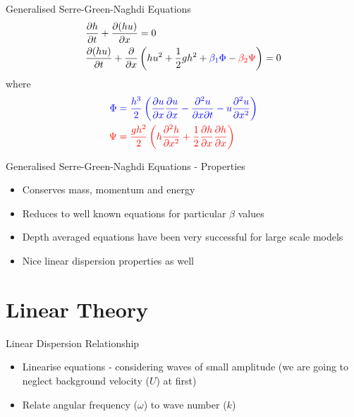 \documentclass[pdf]{beamer}
\begin{document}
\begin{frame}{Generalised Serre-Green-Naghdi Equations}
\begin{align*}
&\dfrac{\partial h}{\partial t} + \dfrac{\partial (hu)}{\partial x} = 0\\
&\dfrac{\partial (hu)}{\partial t} + \dfrac{\partial }{\partial x} \left( hu^2 + \frac{1}{2}gh^2  +  {\color{blue} {\beta_1} \Phi } -   {\color{red} {\beta_2}\Psi}  \right)= 0 \\
\end{align*}
where
\begin{align*}
\color{blue} \Phi  & \color{blue}= \frac{h^3}{2}\left( \frac{\partial u}{\partial x}\frac{\partial u}{\partial x} - \frac{\partial^2 u}{\partial x \partial t} - u\frac{\partial^2 u}{\partial x^2}\right) \\
\color{red} \Psi & \color{red}=  \frac{gh^2}{2} \left(h \frac{\partial^2 h}{\partial x^2} + \frac{1}{2} \frac{\partial h}{\partial x}\frac{\partial h}{\partial x}\right)
\end{align*}
\end{frame}

\begin{frame}{Generalised Serre-Green-Naghdi Equations - Properties}
\begin{itemize}
	\item Conserves mass, momentum and energy
	\item Reduces to well known equations for particular $\beta$ values
	\item Depth averaged equations have been very successful for large scale models
	\item Nice linear dispersion properties as well
\end{itemize}
\end{frame}

\section{Linear Theory}
\begin{frame}{Linear Dispersion Relationship}
\begin{itemize}
	\item Linearise equations - considering waves of small amplitude (we are going to neglect background velocity ($U$) at first)
	\item Relate angular frequency ($\omega$) to  wave number ($k$)
\end{itemize}
\end{frame}
\end{document}
